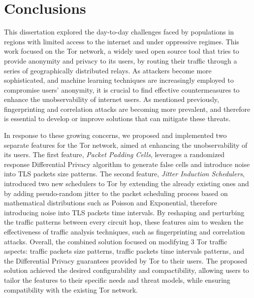 
%

\chapter{Conclusions}\label{cha:conclusions}

This dissertation explored the day-to-day challenges faced by populations in regions with limited access to the internet and under oppressive regimes. This work focused on the Tor network, a widely used open source tool that tries to provide anonymity and privacy to its users, by routing their traffic through a series of geographically distributed relays. As attackers become more sophisticated, and machine learning techniques are increasingly employed to compromise users' anonymity, it is crucial to find effective countermeasures to enhance the unobservability of internet users. As mentioned previously, fingerprinting and correlation attacks are becoming more prevalent, and therefore is essential to develop or improve solutions that can mitigate these threats.

In response to these growing concerns, we proposed and implemented two separate features for the Tor network, aimed at enhancing the unobservability of its users. The first feature, \textit{Packet Padding Cells}, leverages a randomized response Differential Privacy algorithm to generate false cells and introduce noise into TLS packets size patterns. The second feature, \textit{Jitter Induction Schedulers}, introduced two new schedulers to Tor by extending the already existing ones and by adding pseudo-random jitter to the packet scheduling process based on mathematical distributions such as Poisson and Exponential, therefore introducing noise into TLS packets time intervals. By reshaping and perturbing the traffic patterns between every circuit hop, these features aim to weaken the effectiveness of traffic analysis techniques, such as fingerprinting and correlation attacks. Overall, the combined solution focused on modifying 3 Tor traffic aspects: traffic packets size patterns, traffic packets time intervals patterns, and the Differential Privacy guarantees provided by Tor to their users. The proposed solution achieved the desired configurability and compactibility, allowing users to tailor the features to their specific needs and threat models, while ensuring compatibility with the existing Tor network.

